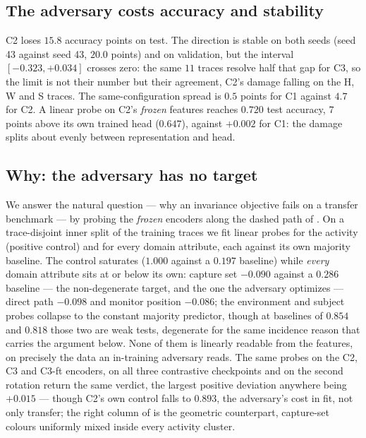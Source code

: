 \subsection{The adversary costs accuracy and stability}
\label{sec:res_grl}

C2 loses $15.8$ accuracy points on test. The direction is stable on both seeds
(seed 43 against seed 43, $20.0$ points) and on validation, but the
interval $[-0.323,+0.034]$ crosses zero: the same $11$ traces resolve half that
gap for C3, so the limit is not their number but their agreement, C2's damage
falling on the H, W and S traces. The same-configuration spread is
$0.5$ points for C1 against $4.7$ for C2. A linear probe on C2's \emph{frozen}
features reaches $0.720$ test accuracy, $7$ points above its own trained head
($0.647$), against $+0.002$ for C1: the damage splits about evenly
between representation and head.

\subsection{Why: the adversary has no target}
\label{sec:res_diag}

We answer the natural question --- why an invariance objective fails on a
transfer benchmark --- by probing the \emph{frozen} encoders along the dashed
path of . On a trace-disjoint inner split of the training
traces we fit linear probes for the activity (positive control) and for every
domain attribute, each against its own majority baseline. The control
saturates ($1.000$ against a $0.197$ baseline) while \emph{every} domain
attribute sits at or below its own: capture set $-0.090$ against a $0.286$
baseline --- the non-degenerate target, and the one the adversary optimizes ---
direct path $-0.098$ and monitor position $-0.086$; the environment and subject
probes collapse to the constant majority predictor, though at baselines of
$0.854$ and $0.818$ those two are weak tests, degenerate for the same incidence
reason that carries the argument below. None of them is linearly readable
from the features, on precisely the data an in-training adversary reads. The
same probes on the C2, C3 and C3-ft encoders, on all three contrastive
checkpoints and on the second rotation return the same
verdict, the largest positive deviation anywhere being $+0.015$ --- though C2's
own control falls to $0.893$, the adversary's cost in fit, not only transfer; the right
column of  is the geometric counterpart, capture-set colours
uniformly mixed inside every activity cluster.

